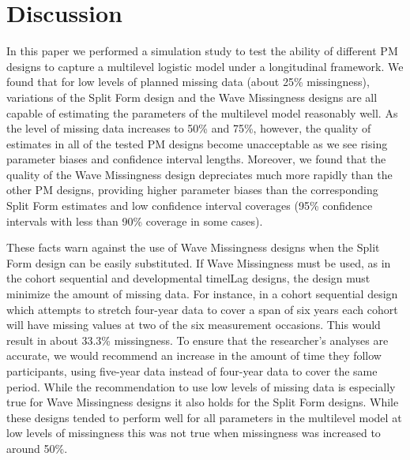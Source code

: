 \documentclass{svjour3}\usepackage[]{graphicx}\usepackage[]{color}
\begin{document}
\section{Discussion}
\label{4}
In this paper we performed a simulation study to test the ability of different PM designs to capture a multilevel logistic model under a longitudinal framework. We found that for low levels of planned missing data (about 25\% missingness), variations of the Split Form design and the Wave Missingness designs are all capable of estimating the parameters of the multilevel model reasonably well. As the level of missing data increases to 50\% and 75\%, however, the quality of estimates in all of the tested PM designs become unacceptable as we see rising parameter biases and confidence interval lengths. Moreover, we found that the quality of the Wave Missingness design depreciates much more rapidly than the other PM designs, providing higher parameter biases than the corresponding Split Form estimates and low confidence interval coverages (95\% confidence intervals with less than 90\% coverage in some cases). \par

These facts warn against the use of Wave Missingness designs when the Split Form design can be easily substituted. If Wave Missingness must be used, as in the cohort sequential and developmental timelLag designs, the design must minimize the amount of missing data. For instance, in a cohort sequential design which attempts to stretch four-year data to cover a span of six years each cohort will have missing values at two of the six measurement occasions. This would result in about 33.3\% missingness. To ensure that the researcher's analyses are accurate, we would recommend an increase in the amount of time they follow participants, using five-year data instead of four-year data to cover the same period. While the recommendation to use low levels of missing data is especially true for Wave Missingness designs it also holds for the Split Form designs. While these designs tended to perform well for all parameters in the multilevel model at low levels of missingness this was not true when missingness was increased to around 50\%. \par
\end{document}
